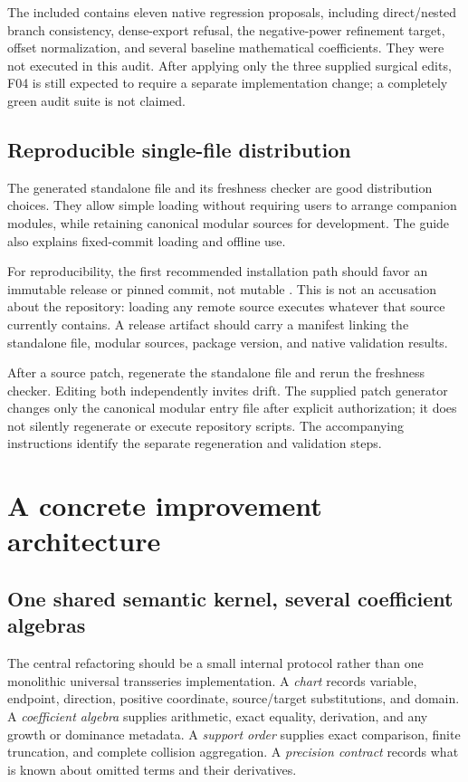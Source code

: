 \documentclass[11pt,a4paper]{article}
\newcommand{\code}[1]{\texttt{\detokenize{#1}}}
\theoremstyle{definition}
\begin{document}
The included \code{AuditRegressions.wlt} contains eleven native regression proposals, including direct/nested branch consistency, dense-export refusal, the negative-power refinement target, offset normalization, and several baseline mathematical coefficients. They were not executed in this audit. After applying only the three supplied surgical edits, F04 is still expected to require a separate implementation change; a completely green audit suite is not claimed.

\subsection{Reproducible single-file distribution}

The generated standalone file and its freshness checker are good distribution choices. They allow simple loading without requiring users to arrange companion modules, while retaining canonical modular sources for development. The guide also explains fixed-commit loading and offline use.\cite{guide,standalone,workflow}

For reproducibility, the first recommended installation path should favor an immutable release or pinned commit, not mutable \code{main}. This is not an accusation about the repository: loading any remote source executes whatever that source currently contains. A release artifact should carry a manifest linking the standalone file, modular sources, package version, and native validation results.

After a source patch, regenerate the standalone file and rerun the freshness checker. Editing both independently invites drift. The supplied patch generator changes only the canonical modular entry file after explicit authorization; it does not silently regenerate or execute repository scripts. The accompanying instructions identify the separate regeneration and validation steps.

\section{A concrete improvement architecture}
\label{sec:design}

\subsection{One shared semantic kernel, several coefficient algebras}

The central refactoring should be a small internal protocol rather than one monolithic universal transseries implementation. A \emph{chart} records variable, endpoint, direction, positive coordinate, source/target substitutions, and domain. A \emph{coefficient algebra} supplies arithmetic, exact equality, derivation, and any growth or dominance metadata. A \emph{support order} supplies exact comparison, finite truncation, and complete collision aggregation. A \emph{precision contract} records what is known about omitted terms and their derivatives.
\end{document}
